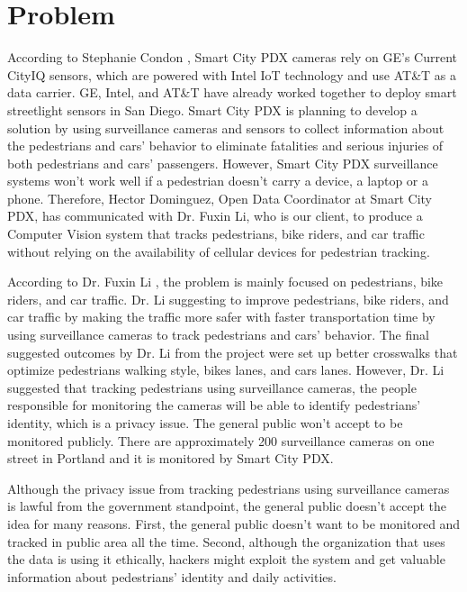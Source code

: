 \documentclass[onecolumn, draftclsnofoot,10pt, compsoc]{IEEEtran}
\begin{document}
\section{Problem}
According to Stephanie Condon \cite{zd}, Smart City PDX cameras rely on GE's Current CityIQ sensors, which are powered with Intel IoT technology and use AT&T as a data carrier. GE, Intel, and AT&T have already worked together to deploy smart streetlight sensors in San Diego. Smart City PDX is planning to develop a solution by using surveillance cameras and sensors to collect information about the pedestrians and cars' behavior to eliminate fatalities and serious injuries of both pedestrians and cars' passengers. However, Smart City PDX surveillance systems won't work well if a pedestrian doesn't carry a device, a laptop or a phone. Therefore, Hector Dominguez, Open Data Coordinator at Smart City PDX, has communicated with Dr. Fuxin Li, who is our client, to produce a Computer Vision system that tracks pedestrians, bike riders, and car traffic without relying on the availability of cellular devices for pedestrian tracking.

According to Dr. Fuxin Li \cite{li}, the problem is mainly focused on pedestrians, bike riders, and car traffic. Dr. Li \cite{li} suggesting to improve pedestrians, bike riders, and car traffic by making the traffic more safer with faster transportation time by using surveillance cameras to track pedestrians and cars' behavior. The final suggested outcomes by Dr. Li \cite{li} from the project were set up better crosswalks that optimize pedestrians walking style, bikes lanes, and cars lanes. However, Dr. Li \cite{li} suggested that tracking pedestrians using surveillance cameras, the people responsible for monitoring the cameras will be able to identify pedestrians' identity, which is a privacy issue. The general public won't accept to be monitored publicly. There are approximately 200 surveillance cameras on one street in Portland and it is monitored by Smart City PDX.

Although the privacy issue from tracking pedestrians using surveillance cameras is lawful from the government standpoint, the general public doesn't accept the idea for many reasons. First, the general public doesn't want to be monitored and tracked in public area all the time. Second,  although the organization that uses the data is using it ethically, hackers might exploit the system and get valuable information about pedestrians' identity and daily activities.
\end{document}
